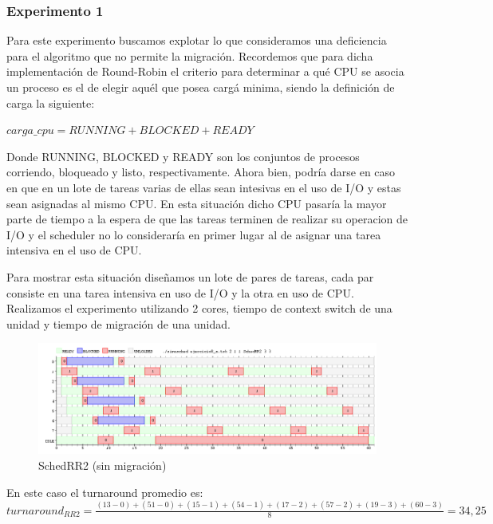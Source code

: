 \documentclass[a4paper,11pt]{article}
\begin{document}
		\subsubsection{Experimento 1}
		Para este experimento buscamos explotar lo que consideramos una deficiencia para el algoritmo que no permite la migración.
		Recordemos que para dicha implementación de Round-Robin el criterio para determinar a qué CPU se asocia un proceso es el de elegir aquél que posea cargá minima, siendo la definición de carga la siguiente:
		\begin{center}
			$carga\_cpu = RUNNING + BLOCKED + READY$
		\end{center}

		Donde RUNNING, BLOCKED y READY son los conjuntos de procesos corriendo, bloqueado y listo, respectivamente.
		Ahora bien, podría darse en caso en que en un lote de tareas varias de ellas sean intesivas en el uso de I/O y estas sean asignadas al mismo CPU. En esta situación dicho CPU pasaría la mayor parte de tiempo a la espera de que las tareas terminen de realizar su operacion de I/O y el scheduler no lo consideraría en primer lugar al de asignar una tarea intensiva en el uso de CPU.
		
		Para mostrar esta situación diseñamos un lote de pares de tareas, cada par consiste en una tarea intensiva en uso de I/O y la otra en uso de CPU. Realizamos el experimento utilizando 2 cores, tiempo de context switch de una unidad y tiempo de migración de una unidad.
		
		\begin{figure}[H]
		\centering
		\includegraphics[scale=.4, width=1\textwidth]{graficos/ej8-a2-2c}
		\caption{SchedRR2 (sin migración)}
		\end{figure}
		
		En este caso el turnaround promedio es:\\
		
		\begin{math}
 			turnaround_{RR2} = \frac{(13-0)+(51-0)+(15-1)+(54-1)+(17-2)+(57-2)+(19-3)+(60-3)}{8} = 34,25
		\end{math}
		\\
\end{document}
